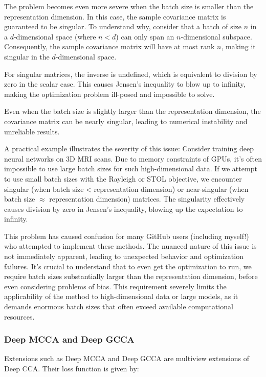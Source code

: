 The problem becomes even more severe when the batch size is smaller than the representation dimension. In this case, the sample covariance matrix is guaranteed to be singular. To understand why, consider that a batch of size $n$ in a $d$-dimensional space (where $n < d$) can only span an $n$-dimensional subspace. Consequently, the sample covariance matrix will have at most rank $n$, making it singular in the $d$-dimensional space.

For singular matrices, the inverse is undefined, which is equivalent to division by zero in the scalar case. This causes Jensen's inequality to blow up to infinity, making the optimization problem ill-posed and impossible to solve.

Even when the batch size is slightly larger than the representation dimension, the covariance matrix can be nearly singular, leading to numerical instability and unreliable results.

A practical example illustrates the severity of this issue: Consider training deep neural networks on 3D MRI scans. Due to memory constraints of GPUs, it's often impossible to use large batch sizes for such high-dimensional data. If we attempt to use small batch sizes with the Rayleigh or STOL objective, we encounter singular (when batch size < representation dimension) or near-singular (when batch size $\approx$ representation dimension) matrices. The singularity effectively causes division by zero in Jensen's inequality, blowing up the expectation to infinity.

This problem has caused confusion for many GitHub users (including myself!) who attempted to implement these methods. The nuanced nature of this issue is not immediately apparent, leading to unexpected behavior and optimization failures. It's crucial to understand that to even get the optimization to run, we require batch sizes substantially larger than the representation dimension, before even considering problems of bias. This requirement severely limits the applicability of the method to high-dimensional data or large models, as it demands enormous batch sizes that often exceed available computational resources.

\subsubsection{Deep MCCA and Deep GCCA}
Extensions such as Deep MCCA \citep{somandepalli2019multimodal} and Deep GCCA \citep{benton2017deep} are multiview extensions of Deep CCA. Their loss function is given by:

